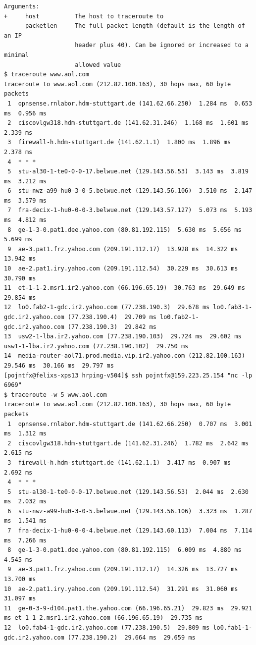 \begin{verbatim}
Arguments:
+     host          The host to traceroute to
      packetlen     The full packet length (default is the length of an IP
                    header plus 40). Can be ignored or increased to a minimal
                    allowed value
$ traceroute www.aol.com
traceroute to www.aol.com (212.82.100.163), 30 hops max, 60 byte packets
 1  opnsense.rnlabor.hdm-stuttgart.de (141.62.66.250)  1.284 ms  0.653 ms  0.956 ms
 2  ciscovlgw318.hdm-stuttgart.de (141.62.31.246)  1.168 ms  1.601 ms  2.339 ms
 3  firewall-h.hdm-stuttgart.de (141.62.1.1)  1.800 ms  1.896 ms  2.378 ms
 4  * * *
 5  stu-al30-1-te0-0-0-17.belwue.net (129.143.56.53)  3.143 ms  3.819 ms  3.212 ms
 6  stu-nwz-a99-hu0-3-0-5.belwue.net (129.143.56.106)  3.510 ms  2.147 ms  3.579 ms
 7  fra-decix-1-hu0-0-0-3.belwue.net (129.143.57.127)  5.073 ms  5.193 ms  4.812 ms
 8  ge-1-3-0.pat1.dee.yahoo.com (80.81.192.115)  5.630 ms  5.656 ms  5.699 ms
 9  ae-3.pat1.frz.yahoo.com (209.191.112.17)  13.928 ms  14.322 ms  13.942 ms
10  ae-2.pat1.iry.yahoo.com (209.191.112.54)  30.229 ms  30.613 ms  30.790 ms
11  et-1-1-2.msr1.ir2.yahoo.com (66.196.65.19)  30.763 ms  29.649 ms  29.854 ms
12  lo0.fab2-1-gdc.ir2.yahoo.com (77.238.190.3)  29.678 ms lo0.fab3-1-gdc.ir2.yahoo.com (77.238.190.4)  29.709 ms lo0.fab2-1-gdc.ir2.yahoo.com (77.238.190.3)  29.842 ms
13  usw2-1-lba.ir2.yahoo.com (77.238.190.103)  29.724 ms  29.602 ms usw1-1-lba.ir2.yahoo.com (77.238.190.102)  29.750 ms
14  media-router-aol71.prod.media.vip.ir2.yahoo.com (212.82.100.163)  29.546 ms  30.166 ms  29.797 ms
[pojntfx@felixs-xps13 hrping-v504]$ ssh pojntfx@159.223.25.154 "nc -lp 6969"
$ traceroute -w 5 www.aol.com
traceroute to www.aol.com (212.82.100.163), 30 hops max, 60 byte packets
 1  opnsense.rnlabor.hdm-stuttgart.de (141.62.66.250)  0.707 ms  3.001 ms  1.312 ms
 2  ciscovlgw318.hdm-stuttgart.de (141.62.31.246)  1.782 ms  2.642 ms  2.615 ms
 3  firewall-h.hdm-stuttgart.de (141.62.1.1)  3.417 ms  0.907 ms  2.692 ms
 4  * * *
 5  stu-al30-1-te0-0-0-17.belwue.net (129.143.56.53)  2.044 ms  2.630 ms  2.032 ms
 6  stu-nwz-a99-hu0-3-0-5.belwue.net (129.143.56.106)  3.323 ms  1.287 ms  1.541 ms
 7  fra-decix-1-hu0-0-0-4.belwue.net (129.143.60.113)  7.004 ms  7.114 ms  7.266 ms
 8  ge-1-3-0.pat1.dee.yahoo.com (80.81.192.115)  6.009 ms  4.880 ms  4.545 ms
 9  ae-3.pat1.frz.yahoo.com (209.191.112.17)  14.326 ms  13.727 ms  13.700 ms
10  ae-2.pat1.iry.yahoo.com (209.191.112.54)  31.291 ms  31.060 ms  31.097 ms
11  ge-0-3-9-d104.pat1.the.yahoo.com (66.196.65.21)  29.823 ms  29.921 ms et-1-1-2.msr1.ir2.yahoo.com (66.196.65.19)  29.735 ms
12  lo0.fab4-1-gdc.ir2.yahoo.com (77.238.190.5)  29.809 ms lo0.fab1-1-gdc.ir2.yahoo.com (77.238.190.2)  29.664 ms  29.659 ms

\end{verbatim}
